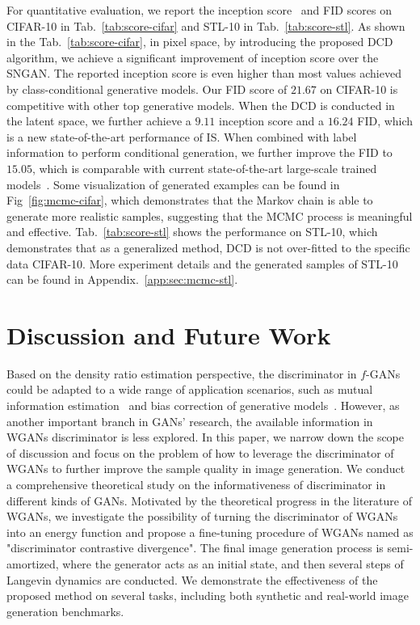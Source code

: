 \documentclass{article}
\begin{document}
For quantitative evaluation, we report the inception score~\cite{salimans2016improved} and FID \cite{heusel2017gans} scores on CIFAR-10 in Tab.~\ref{tab:score-cifar} and STL-10 in Tab.~\ref{tab:score-stl}. As shown in the Tab.~\ref{tab:score-cifar}, in pixel space, by introducing the proposed DCD algorithm, we achieve a significant improvement of inception score over the SNGAN. The reported inception score is even higher than most values achieved by class-conditional generative models. Our FID score of $21.67$ on CIFAR-10 is competitive with other top generative models. When the DCD is conducted in the latent space, we further achieve a $9.11$ inception score and a $16.24$ FID, which is a new state-of-the-art performance of IS. When combined with label information to perform conditional generation, we further improve the FID to $15.05$, which is comparable with current state-of-the-art large-scale trained models~\cite{brock2018large}. Some visualization of generated examples can be found in Fig~\ref{fig:mcmc-cifar}, which demonstrates that the Markov chain is able to generate more realistic samples, suggesting that the MCMC process is meaningful and effective. Tab.~\ref{tab:score-stl} shows the performance on STL-10, which demonstrates that as a generalized method, DCD is not over-fitted to the specific data CIFAR-10. More experiment details and the generated samples of STL-10 can be found in Appendix.~\ref{app:sec:mcmc-stl}.

\section{Discussion and Future Work}
Based on the density ratio estimation perspective, the discriminator in $f$-GANs could be adapted to a wide range of application scenarios, such as mutual information estimation~\cite{hjelm2018learning} and bias correction of generative models~\cite{grover2019bias}.  However, as another important branch in GANs' research, the available information in WGANs discriminator is less explored. In this paper, we narrow down the scope of discussion and focus on the problem of how to leverage the discriminator of WGANs to further improve the sample quality in image generation. We conduct a comprehensive theoretical study on the informativeness of discriminator in different kinds of GANs. Motivated by the theoretical progress in the literature of WGANs, we investigate the possibility of turning the discriminator of WGANs into an energy function and propose a fine-tuning procedure of WGANs named as "discriminator contrastive divergence". The final image generation process is semi-amortized, where the generator acts as an initial state, and then several steps of Langevin dynamics are conducted.  We demonstrate the effectiveness of the proposed method on several tasks, including both synthetic and real-world image generation benchmarks. 
\end{document}

